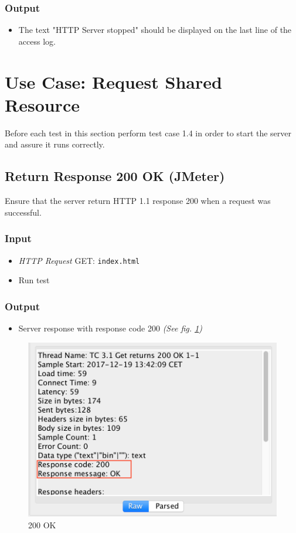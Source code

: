\documentclass[a4paper, 12pt]{article}
\begin{document}
\subsubsection{Output}
\begin{itemize}
\item The text "HTTP Server stopped" should be displayed on the last line of the access log.
\end{itemize}


\newpage
\section{Use Case: Request Shared Resource}

Before each test in this section perform test case 1.4 in order to start the server and assure it runs correctly.

\subsection{Return Response 200 OK (JMeter)}

Ensure that the server return HTTP 1.1 response 200 when a request was successful.

\subsubsection{Input}
\begin{itemize}
\item \textit{HTTP Request} GET: \texttt{index.html}
\item Run test
\end{itemize}

\subsubsection{Output}
\begin{itemize}
\item Server response with response code 200 \textit{(See fig. \ref{TC3.1})}
\end{itemize}

\begin{figure}[H]
\includegraphics[scale=0.7]{output_clarification/200OK.png} 
\caption{200 OK}
\label{TC3.1}
\end{figure}
\end{document}
